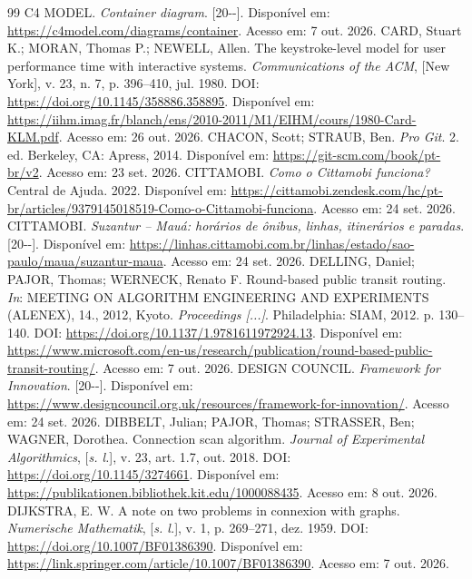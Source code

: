 \documentclass[12pt,oneside,a4paper,brazil,chapter=TITLE]{abntex2}
\begin{document}
\begin{thebibliography}{99}
 C4 MODEL. \textit{Container diagram}. [20\mbox{-}\mbox{-}]. Disponível em: \url{https://c4model.com/diagrams/container}. Acesso em: 7 out. 2026.
 CARD, Stuart K.; MORAN, Thomas P.; NEWELL, Allen. The keystroke-level model for user performance time with interactive systems. \textit{Communications of the ACM}, [New York], v. 23, n. 7, p. 396--410, jul. 1980. DOI: \url{https://doi.org/10.1145/358886.358895}. Disponível em: \url{https://iihm.imag.fr/blanch/ens/2010-2011/M1/EIHM/cours/1980-Card-KLM.pdf}. Acesso em: 26 out. 2026.
 CHACON, Scott; STRAUB, Ben. \textit{Pro Git}. 2. ed. Berkeley, CA: Apress, 2014. Disponível em: \url{https://git-scm.com/book/pt-br/v2}. Acesso em: 23 set. 2026.
 CITTAMOBI. \textit{Como o Cittamobi funciona?} Central de Ajuda. 2022. Disponível em: \url{https://cittamobi.zendesk.com/hc/pt-br/articles/9379145018519-Como-o-Cittamobi-funciona}. Acesso em: 24 set. 2026.
 CITTAMOBI. \textit{Suzantur -- Mauá: horários de ônibus, linhas, itinerários e paradas}. [20\mbox{-}\mbox{-}]. Disponível em: \url{https://linhas.cittamobi.com.br/linhas/estado/sao-paulo/maua/suzantur-maua}. Acesso em: 24 set. 2026.
 DELLING, Daniel; PAJOR, Thomas; WERNECK, Renato F. Round-based public transit routing. \textit{In}: MEETING ON ALGORITHM ENGINEERING AND EXPERIMENTS (ALENEX), 14., 2012, Kyoto. \textit{Proceedings [...]}. Philadelphia: SIAM, 2012. p. 130--140. DOI: \url{https://doi.org/10.1137/1.9781611972924.13}. Disponível em: \url{https://www.microsoft.com/en-us/research/publication/round-based-public-transit-routing/}. Acesso em: 7 out. 2026.
 DESIGN COUNCIL. \textit{Framework for Innovation}. [20\mbox{-}\mbox{-}]. Disponível em: \url{https://www.designcouncil.org.uk/resources/framework-for-innovation/}. Acesso em: 24 set. 2026.
 DIBBELT, Julian; PAJOR, Thomas; STRASSER, Ben; WAGNER, Dorothea. Connection scan algorithm. \textit{Journal of Experimental Algorithmics}, [\textit{s. l.}], v. 23, art. 1.7, out. 2018. DOI: \url{https://doi.org/10.1145/3274661}. Disponível em: \url{https://publikationen.bibliothek.kit.edu/1000088435}. Acesso em: 8 out. 2026.
 DIJKSTRA, E. W. A note on two problems in connexion with graphs. \textit{Numerische Mathematik}, [\textit{s. l.}], v. 1, p. 269--271, dez. 1959. DOI: \url{https://doi.org/10.1007/BF01386390}. Disponível em: \url{https://link.springer.com/article/10.1007/BF01386390}. Acesso em: 7 out. 2026.

\end{thebibliography}
\end{document}
